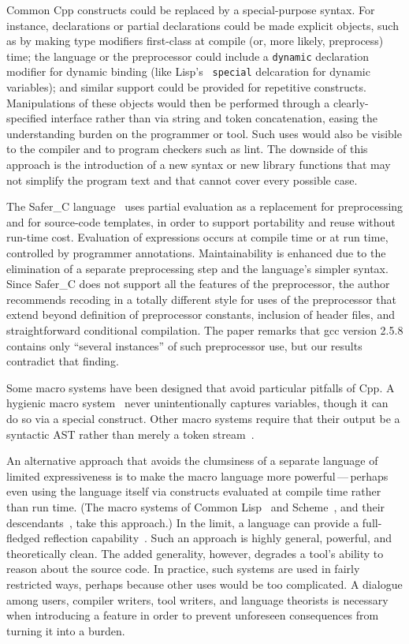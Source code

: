 \documentclass[10pt]{article}
\newcommand{\pkg}[1]{\textsf{#1}}
\begin{document}
Common Cpp constructs could be replaced by a special-purpose syntax.  For
instance, declarations or partial declarations could be made explicit
objects, such as by making type modifiers first-class at compile (or, more
likely, preprocess) time; the language or the preprocessor could include a
{\tt dynamic} declaration modifier for dynamic binding (like Lisp's {\tt
special} delcaration for dynamic variables); and
similar support could be provided for repetitive constructs.  Manipulations
of these objects would then be performed through a clearly-specified
interface rather than via string and token concatenation, easing the
understanding burden on the programmer or tool.  Such uses would also be
visible to the compiler and to program checkers such as lint.  The downside
of this approach is the introduction of a new syntax or new library
functions that may not simplify the program text and that cannot cover
every possible case.

The Safer\_C language~\cite{ICCC::Salomon1996} uses partial evaluation as a
replacement for preprocessing and for source-code templates, in order to
support portability and reuse without run-time cost.  Evaluation of
expressions occurs at compile time or at run time, controlled by programmer
annotations.  Maintainability is enhanced due to the elimination of a
separate preprocessing step and the language's simpler syntax.  Since
Safer\_C does not support all the features of the preprocessor, the author
recommends recoding in a totally different style for uses of the
preprocessor that extend beyond definition of preprocessor constants,
inclusion of header files, and straightforward conditional compilation.
The paper remarks that \pkg{gcc} version 2.5.8 contains only ``several
instances'' of such preprocessor use, but our results contradict that
finding.

Some macro systems have been designed that avoid particular pitfalls of Cpp.
A hygienic macro system~\cite{lfp86*151} never unintentionally captures
variables, though it can do so via a special construct.
Other macro systems require that their output be a syntactic AST rather
than merely a token stream~\cite{WeiseC93}.

An alternative approach that avoids the clumsiness of a separate language
of limited expressiveness is to make the macro language more
powerful\,---\,perhaps even using the language itself via constructs
evaluated at compile time rather than run time.  (The macro systems of
Common Lisp~\cite{commonlisp:languagespec} and
Scheme~\cite{KelseyCR98}, and their descendants~\cite{WeiseC93}, take
this approach.)  In the limit, a language can provide a full-fledged
reflection capability~\cite{kicz91}.  Such an approach is highly general,
powerful, and theoretically clean.  The added generality, however, degrades
a tool's ability to reason about the source code.  In practice, such
systems are used in fairly restricted ways, perhaps because other uses
would be too complicated.  A dialogue among users, compiler writers, tool
writers, and language theorists is necessary when introducing a feature in
order to prevent unforeseen consequences from turning it into a burden.
\end{document}
